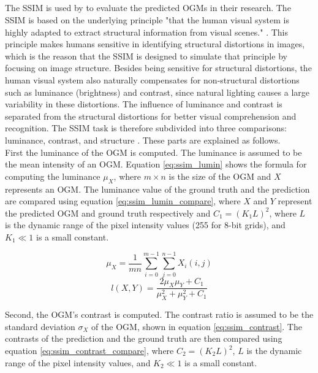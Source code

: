 \subsection{} \label{subsec:ssim_met}
The \gls{SSIM} is used by \cite{mohajerin2019multi} to evaluate the predicted \glspl{OGM} in their research. The \gls{SSIM} is based on the underlying principle "that the human visual system is highly adapted to extract structural information from visual scenes." \cite{wang2009mean}. This principle makes humans sensitive in identifying structural distortions in images, which is the reason that the \gls{SSIM} is designed to simulate that principle by focusing on image structure. Besides being sensitive for structural distortions, the human visual system also naturally compensates for non-structural distortions such as luminance (brightness) and contrast, since natural lighting causes a large variability in these distortions. The influence of luminance and contrast is separated from the structural distortions for better visual comprehension and recognition. The \gls{SSIM} task is therefore subdivided into three comparisons: luminance, contrast, and structure \cite{wang2004image}. These parts are explained as follows.\\

First the luminance of the \gls{OGM} is computed. The luminance is assumed to be the mean intensity of an \gls{OGM}. Equation \ref{eq:ssim_lumin} shows the formula for computing the luminance $\mu_X$, where $m \times n$ is the size of the \gls{OGM} and $X$ represents an \gls{OGM}. The luminance value of the ground truth and the prediction are compared using equation \ref{eq:ssim_lumin_compare}, where $X$ and $Y$ represent the predicted \gls{OGM} and ground truth respectively and $C_1 = (K_1 L)^2$, where $L$ is the dynamic range of the pixel intensity values (255 for 8-bit grids), and $K_1 \ll 1$ is a small constant.

\begin{equation} \label{eq:ssim_lumin}
	\mu_X = \frac{1}{mn}\sum_{i=0}^{m-1}\sum_{j=0}^{n-1}X_i(i,j)
\end{equation}
\begin{equation} \label{eq:ssim_lumin_compare}
	l(X,Y) = \frac{2\mu_X \mu_Y + C_1}{\mu_X ^2 + \mu_Y ^2 + C_1}
\end{equation}

Second, the \gls{OGM}'s contrast is computed. The contrast ratio is assumed to be the standard deviation $\sigma_X$ of the \gls{OGM}, shown in equation \ref{eq:ssim_contrast}. The contrasts of the prediction and the ground truth are then compared using equation \ref{eq:ssim_contrast_compare}, where $C_2 = (K_2 L)^2$, $L$ is the dynamic range of the pixel intensity values, and $K_2 \ll 1$ is a small constant.

